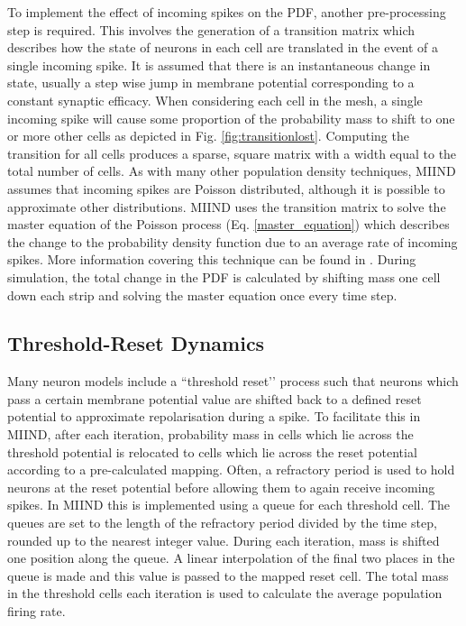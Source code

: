 \documentclass[utf8]{frontiersSCNS} %
\begin{document}
To implement the effect of incoming spikes on the PDF, another pre-processing step is required. This involves the generation of a transition matrix which describes how the state of neurons in each cell are translated in the event of a single incoming spike. It is assumed that there is an instantaneous change in state, usually a step wise jump in membrane potential corresponding to a constant synaptic efficacy. When considering each cell in the mesh, a single incoming spike will cause some proportion of the probability mass to shift to one or more other cells as depicted in Fig. \ref{fig:transitionlost}. Computing the transition for all cells produces a sparse, square matrix with a width equal to the total number of cells. As with many other population density techniques, MIIND assumes that incoming spikes are Poisson distributed, although it is possible to approximate other distributions. MIIND uses the transition matrix to solve the master equation of the Poisson process (Eq. \ref{master_equation}) which describes the change to the probability density function due to an average rate of incoming spikes. More information covering this technique can be found in \cite{de2019computational,de2013generic}. During simulation, the total change in the PDF is calculated by shifting mass one cell down each strip and solving the master equation once every time step.\\

\subsection{Threshold-Reset Dynamics}

Many neuron models include a ``threshold reset’’ process such that neurons which pass a certain membrane potential value are shifted back to a defined reset potential to approximate repolarisation during a spike. To facilitate this in MIIND, after each iteration, probability mass in cells which lie across the threshold potential is relocated to cells which lie across the reset potential according to a pre-calculated mapping. Often, a refractory period is used to hold neurons at the reset potential before allowing them to again receive incoming spikes. In MIIND this is implemented using a queue for each threshold cell. The queues are set to the length of the refractory period divided by the time step, rounded up to the nearest integer value. During each iteration, mass is shifted one position along the queue. A linear interpolation of the final two places in the queue is made and this value is passed to the mapped reset cell. The total mass in the threshold cells each iteration is used to calculate the average population firing rate.\\
\end{document}
